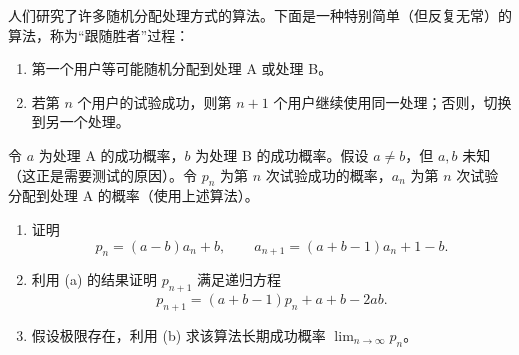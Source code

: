 \documentclass[UTF8, 12pt, fontset=fandol, oneside]{ctexart}
\begin{document}
\begin{enumerate}
  人们研究了许多随机分配处理方式的算法。下面是一种特别简单（但反复无常）的算法，称为“跟随胜者”过程：
  \begin{enumerate}
    \item[(i)] 第一个用户等可能随机分配到处理 A 或处理 B。
    \item[(ii)] 若第 $n$ 个用户的试验成功，则第 $n+1$ 个用户继续使用同一处理；否则，切换到另一个处理。
  \end{enumerate}
  令 $a$ 为处理 A 的成功概率，$b$ 为处理 B 的成功概率。假设 $a\ne b$，但 $a,b$ 未知（这正是需要测试的原因）。令 $p_n$ 为第 $n$ 次试验成功的概率，$a_n$ 为第 $n$ 次试验分配到处理 A 的概率（使用上述算法）。
  \begin{enumerate}
    \item 证明
    \[
      p_n=(a-b)a_n+b,\qquad
      a_{n+1}=(a+b-1)a_n+1-b.
    \]
    \item 利用 (a) 的结果证明 $p_{n+1}$ 满足递归方程
    \[
      p_{n+1}=(a+b-1)p_n+a+b-2ab.
    \]
    \item 假设极限存在，利用 (b) 求该算法长期成功概率 $\lim_{n\to\infty}p_n$。
  \end{enumerate}
\end{enumerate}
\end{document}
